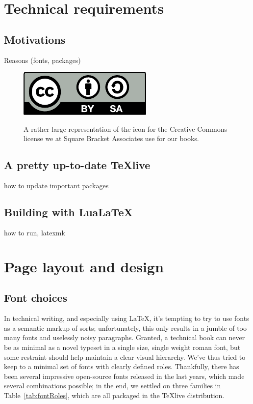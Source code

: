 \documentclass[twoside,openany,showtrims]{sbabook}
\begin{document}
\chapter{Technical requirements}


\section{Motivations}

Reasons (fonts, packages)

\begin{figure}[tb]
  \caption{A rather large representation of the icon for the Creative Commons
    license we at Square Bracket Associates use for our books.}
  \includegraphics{CreativeCommons-BY-SA}
  \label{fig:cc-by-sa-icon}
\end{figure}


\section{A pretty up-to-date TeXlive}

how to update
important packages


\section{Building with Lua\LaTeX}

how to run, latexmk


\chapter{Page layout and design}


\section{Font choices}

In technical writing, and especially using \LaTeX{}, it's tempting to try to use
fonts as a semantic markup of sorts; unfortunately, this only results in a
jumble of too many fonts and uselessly noisy paragraphs.
Granted, a technical book can never be as minimal as a novel typeset in a single
size, single weight roman font, but some restraint should help maintain a clear
visual hierarchy.
We've thus tried to keep to a minimal set of fonts with clearly defined roles.
Thankfully, there has been several impressive open-source fonts released in the
last years, which made several combinations possible; in the end, we settled on
three families in Table~\ref{tab:fontRoles}, which are all packaged in the
\TeX{}live distribution.
\end{document}

